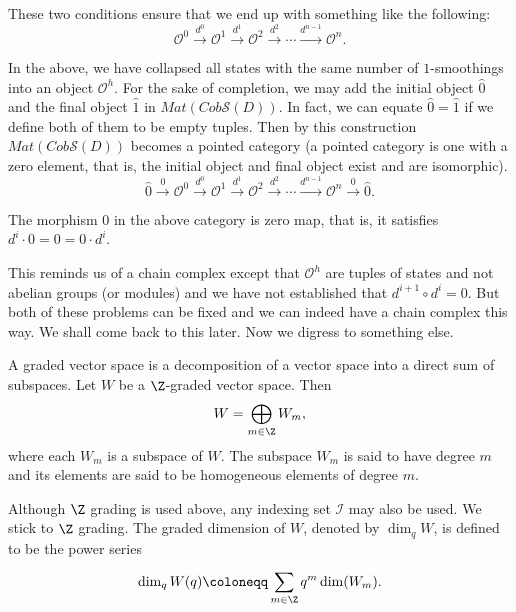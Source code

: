 These two conditions ensure that we end up with something like the following: 
\begin{equation}
\label{eq:7}
\mathcal{O}^{0} \xrightarrow{d^0} \mathcal{O}^1 \xrightarrow{d^1} \mathcal{O}^2 \xrightarrow{d^2} \cdots \xrightarrow{d^{n-1}} \mathcal{O}^{n}.
\end{equation}

In the above, we have collapsed all states with the same number of $1$-smoothings into an object $\mathcal{O}^h$. For the sake of completion, we may add the initial object $\hat{0}$ and the final object $\hat{1}$ in $Mat(Cob\mathcal{S}(D))$. In fact, we can equate $\hat{0} = \hat{1}$ if we define both of them to be empty tuples. Then by this construction $Mat(Cob\mathcal{S}(D))$ becomes a pointed category (a pointed category is one with a zero element, that is, the initial object and final object exist and are isomorphic).
\begin{equation}
\label{eq:8}
\hat{0} \xrightarrow{0} \mathcal{O}^{0} \xrightarrow{d^0} \mathcal{O}^1 \xrightarrow{d^1} \mathcal{O}^2 \xrightarrow{d^2} \cdots \xrightarrow{d^{n-1}} \mathcal{O}^{n} \xrightarrow{0} \hat{0}.
\end{equation}

The morphism $0$ in the above category is zero map, that is, it satisfies $d^i \cdot 0 = 0 = 0\cdot d^i$.

This reminds us of a chain complex except that $\mathcal{O}^h$ are tuples of states and not abelian groups (or modules) and we have not established that $d^{i+1} \circ d^{i} = 0$. But both of these problems can be fixed and we can indeed have a chain complex this way. We shall come back to this later. Now we digress to something else.

A graded vector space is a decomposition of a vector space into a direct sum of subspaces. Let $W$ be a $\Z$-graded vector space. Then 
\begin{displaymath}
W = \bigoplus_{m\in\Z} W_m,
\end{displaymath}
where each $W_m$ is a subspace of $W$. The subspace $W_m$ is said to have degree $m$ and its elements are said to be homogeneous elements of degree $m$.

Although $\Z$ grading is used above, any indexing set $\mathcal{I}$ may also be used. We stick to $\Z$ grading. The graded dimension of $W$, denoted by $\dim_q W$, is defined to be the power series
\begin{equation}
\label{eq:9}
\dim_q W(q) \coloneqq \sum_{m \in \Z}^{} q^m \dim(W_m).
\end{equation}

